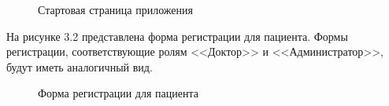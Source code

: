 \begin{figure}[!h]
	\caption{Стартовая страница приложения}
\end{figure}


На рисунке 3.2 представлена форма регистрации для пациента. Формы регистрации, соответствующие ролям <<Доктор>> и <<Администратор>>, будут иметь аналогичный вид.

\begin{figure}[!h]
	\caption{Форма регистрации для пациента}
\end{figure}

%
%
%
%

